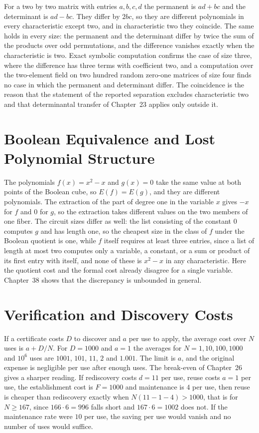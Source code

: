 \documentclass[11pt,letterpaper]{report}
\theoremstyle{plain}
\theoremstyle{definition}
\theoremstyle{remark}
\begin{document}
For a two by two matrix with entries $a,b,c,d$ the permanent is $ad+bc$ and the determinant is $ad-bc$. They differ by $2bc$, so they are different polynomials in every characteristic except two, and in characteristic two they coincide. The same holds in every size: the permanent and the determinant differ by twice the sum of the products over odd permutations, and the difference vanishes exactly when the characteristic is two. Exact symbolic computation confirms the case of size three, where the difference has three terms with coefficient two, and a computation over the two-element field on two hundred random zero-one matrices of size four finds no case in which the permanent and determinant differ. The coincidence is the reason that the statement of the reported separation excludes characteristic two and that determinantal transfer of Chapter~23 applies only outside it.

\section{Boolean Equivalence and Lost Polynomial Structure}

The polynomials $f(x)=x^2-x$ and $g(x)=0$ take the same value at both points of the Boolean cube, so $E(f)=E(g)$, and they are different polynomials. The extraction of the part of degree one in the variable $x$ gives $-x$ for $f$ and $0$ for $g$, so the extraction takes different values on the two members of one fiber. The circuit sizes differ as well: the list consisting of the constant $0$ computes $g$ and has length one, so the cheapest size in the class of $f$ under the Boolean quotient is one, while $f$ itself requires at least three entries, since a list of length at most two computes only a variable, a constant, or a sum or product of its first entry with itself, and none of these is $x^2-x$ in any characteristic. Here the quotient cost and the formal cost already disagree for a single variable. Chapter~38 shows that the discrepancy is unbounded in general.

\section{Verification and Discovery Costs}

If a certificate costs $D$ to discover and $a$ per use to apply, the average cost over $N$ uses is $a+D/N$. For $D=1000$ and $a=1$ the averages for $N=1,10,100,1000$ and $10^6$ uses are $1001$, $101$, $11$, $2$ and $1.001$. The limit is $a$, and the original expense is negligible per use after enough uses. The break-even of Chapter~26 gives a sharper reading. If rediscovery costs $d=11$ per use, reuse costs $a=1$ per use, the establishment cost is $F=1000$ and maintenance is $4$ per use, then reuse is cheaper than rediscovery exactly when $N(11-1-4)>1000$, that is for $N\ge167$, since $166\cdot6=996$ falls short and $167\cdot6=1002$ does not. If the maintenance rate were $10$ per use, the saving per use would vanish and no number of uses would suffice.
\end{document}
